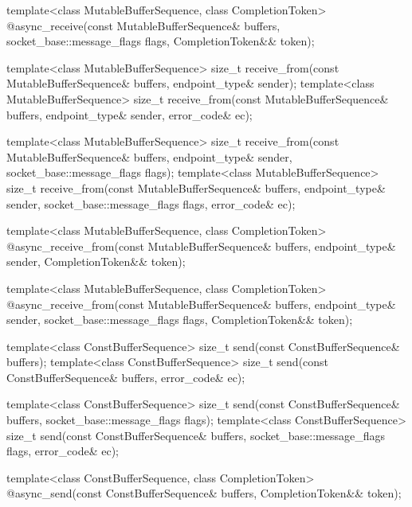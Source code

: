 \begin{codeblock}
{{{    template<class MutableBufferSequence, class CompletionToken>
      @\DEDUCED@ async_receive(const MutableBufferSequence& buffers,
                            socket_base::message_flags flags,
                            CompletionToken&& token);

    template<class MutableBufferSequence>
      size_t receive_from(const MutableBufferSequence& buffers,
                          endpoint_type& sender);
    template<class MutableBufferSequence>
      size_t receive_from(const MutableBufferSequence& buffers,
                          endpoint_type& sender, error_code& ec);

    template<class MutableBufferSequence>
      size_t receive_from(const MutableBufferSequence& buffers,
                          endpoint_type& sender,
                          socket_base::message_flags flags);
    template<class MutableBufferSequence>
      size_t receive_from(const MutableBufferSequence& buffers,
                          endpoint_type& sender,
                          socket_base::message_flags flags,
                          error_code& ec);

    template<class MutableBufferSequence, class CompletionToken>
      @\DEDUCED@ async_receive_from(const MutableBufferSequence& buffers,
                                 endpoint_type& sender,
                                 CompletionToken&& token);

    template<class MutableBufferSequence, class CompletionToken>
      @\DEDUCED@ async_receive_from(const MutableBufferSequence& buffers,
                                 endpoint_type& sender,
                                 socket_base::message_flags flags,
                                 CompletionToken&& token);

    template<class ConstBufferSequence>
      size_t send(const ConstBufferSequence& buffers);
    template<class ConstBufferSequence>
      size_t send(const ConstBufferSequence& buffers, error_code& ec);

    template<class ConstBufferSequence>
      size_t send(const ConstBufferSequence& buffers,
                  socket_base::message_flags flags);
    template<class ConstBufferSequence>
      size_t send(const ConstBufferSequence& buffers,
                  socket_base::message_flags flags, error_code& ec);

    template<class ConstBufferSequence, class CompletionToken>
      @\DEDUCED@ async_send(const ConstBufferSequence& buffers,
                         CompletionToken&& token);

}}}
\end{codeblock}
